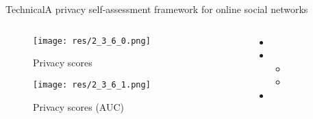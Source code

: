 \begin{frame}{Technical}{A privacy self-assessment framework for online social networks \cite{pensa_privacy_2017}}

	\begin{columns}
		\begin{column}{0.4\textwidth}
			\begin{center}
			
				\begin{figure}
					\texttt{[image: res/2\_3\_6\_0.png]}
					\caption{\label{fig:2_3_6_0}Privacy scores}
					
					\texttt{[image: res/2\_3\_6\_1.png]}
					\caption{\label{fig:2_3_6_1}Privacy scores (AUC)}
				\end{figure}
				
			\end{center}
		\end{column}
		
		\begin{column}{0.6\textwidth}
		
			\begin{itemize}
				\item 
				
				\item 
					\begin{itemize}
						\item 
						\item 
					\end{itemize}
				
				\item 
			\end{itemize}
			
		\end{column}
	\end{columns}
	

\end{frame}

